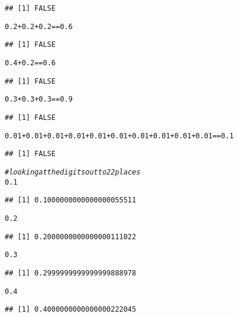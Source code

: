 \documentclass{article}\usepackage[]{graphicx}\usepackage[]{color}
\makeatletter
\newcommand{\hlnum}[1]{\textcolor[rgb]{0.686,0.059,0.569}{#1}}%
\newcommand{\hlcom}[1]{\textcolor[rgb]{0.678,0.584,0.686}{\textit{#1}}}%
\newcommand{\hlopt}[1]{\textcolor[rgb]{0,0,0}{#1}}%
\newenvironment{kframe}{%
 \def\at@end@of@kframe{}%
 \ifinner\ifhmode%
  \def\at@end@of@kframe{\end{minipage}}%
  \begin{minipage}{\columnwidth}%
 \fi\fi%
 \def\FrameCommand##1{\hskip\@totalleftmargin \hskip-\fboxsep
 \colorbox{shadecolor}{##1}\hskip-\fboxsep
     \hskip-\linewidth \hskip-\@totalleftmargin \hskip\columnwidth}%
 \MakeFramed {\advance\hsize-\width
   \@totalleftmargin\z@ \linewidth\hsize
   \@setminipage}}%
 {\par\unskip\endMakeFramed%
 \at@end@of@kframe}
\newenvironment{knitrout}{}{} %
\makeatother
\begin{document}
\begin{knitrout}
\begin{kframe}
\begin{verbatim}
## [1] FALSE
\end{verbatim}
\begin{alltt}
\hlnum{0.2} \hlopt{+} \hlnum{0.2} \hlopt{+} \hlnum{0.2} \hlopt{==} \hlnum{0.6}
\end{alltt}
\begin{verbatim}
## [1] FALSE
\end{verbatim}
\begin{alltt}
\hlnum{0.4} \hlopt{+} \hlnum{0.2} \hlopt{==} \hlnum{0.6}
\end{alltt}
\begin{verbatim}
## [1] FALSE
\end{verbatim}
\begin{alltt}
\hlnum{0.3} \hlopt{+} \hlnum{0.3} \hlopt{+} \hlnum{0.3} \hlopt{==} \hlnum{0.9}
\end{alltt}
\begin{verbatim}
## [1] FALSE
\end{verbatim}
\begin{alltt}
\hlnum{0.01} \hlopt{+} \hlnum{0.01} \hlopt{+} \hlnum{0.01} \hlopt{+} \hlnum{0.01} \hlopt{+} \hlnum{0.01} \hlopt{+} \hlnum{0.01} \hlopt{+} \hlnum{0.01} \hlopt{+} \hlnum{0.01} \hlopt{+} \hlnum{0.01} \hlopt{+} \hlnum{0.01} \hlopt{==} \hlnum{0.1}
\end{alltt}
\begin{verbatim}
## [1] FALSE
\end{verbatim}
\begin{alltt}
\hlcom{#looking at the digits out to 22 places}
\hlnum{0.1}
\end{alltt}
\begin{verbatim}
## [1] 0.1000000000000000055511
\end{verbatim}
\begin{alltt}
\hlnum{0.2}
\end{alltt}
\begin{verbatim}
## [1] 0.2000000000000000111022
\end{verbatim}
\begin{alltt}
\hlnum{0.3}
\end{alltt}
\begin{verbatim}
## [1] 0.2999999999999999888978
\end{verbatim}
\begin{alltt}
\hlnum{0.4}
\end{alltt}
\begin{verbatim}
## [1] 0.4000000000000000222045
\end{verbatim}

\end{kframe}
\end{knitrout}
\end{document}
